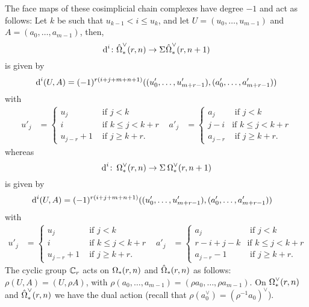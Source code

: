 	The face maps of these cosimplicial chain complexes have degree $-1$ and act as follows: Let $k$ be such that $u_{k-1}<i\leq u_k$, and let $U = (u_0,\ldots,u_{m-1})$ and $A = (a_0,\ldots,a_{m-1})$, then, 
	\[
		\operatorname{d}^i\colon \hat{\operatorname{\Omega}}^{\vee}_{*}(r,n)\to \Sigma^{}\hat{\operatorname{\Omega}}^{\vee}_{*}(r,n+1)
	\]
		is given by
	\[\operatorname{d}^i(U, A) = (-1)^{r(i+j+m+n+1)}((u'_0,\ldots,u'_{m+r-1}),(a'_0,\ldots,a'_{m+r-1}))\] with
\begin{align}\label{eq:Omegahat}
	u'_j &=
	\begin{cases}
		u_j &\text{ if $j<k$} \\
		i & \text{ if $k\leq j < k+r$} \\
		u_{j-r} + 1 & \text{ if $j\geq k+r$.}
	\end{cases}
	&
	a'_j &=
	\begin{cases}
		a_j &\text{ if $j<k$} \\
		j-i & \text{if $k\leq j<k+r$} \\
		a_{j-r} & \text{ if $j\geq k+r$.}
	\end{cases}
\end{align}
whereas 
\[
	\operatorname{d}^i\colon \operatorname{\Omega}^{\vee}_{*}(r,n)\to \Sigma^{}\operatorname{\Omega}^{\vee}_{*}(r,n+1)
	\]
	is given by
\begin{align*}
	\operatorname{d}^i(U, A) &= (-1)^{r(i + j + m + n + 1)}((u'_0,\ldots,u'_{m+r-1}),(a'_0,\ldots,a'_{m+r-1}))
\end{align*}
with
\begin{align}\label{eq:Theta}
	u'_j &=
	\begin{cases}
		u_j &\text{ if $j<k$} \\
		i & \text{ if $k\leq j < k+r$} \\
		u_{j-r} + 1 & \text{ if $j\geq k+r$.}
	\end{cases}
	&
	a'_j &=
	\begin{cases}
		a_j &\text{ if $j<k$} \\
		r-i+j-k & \text{if $k\leq j<k+r$} \\
		a_{j-r}-1 & \text{ if $j\geq k+r$.}
	\end{cases}
\end{align}
The cyclic group $\mathbb{C}_r$ acts on $\operatorname{\Omega}_{*}(r,n)$ and $\hat{\operatorname{\Omega}}_{*}(r,n)$ as follows: $\rho(U,A) = (U,\rho A)$, with $\rho(a_0,\ldots,a_{m-1}) = (\rho a_0,\ldots,\rho a_{m-1})$. On $\operatorname{\Omega}^{\vee}_{*}(r,n)$ and $\hat{\operatorname{\Omega}}^{\vee}_{*}(r,n)$ we have the dual action (recall that $\rho(a_0^\vee) = (\rho^{-1}a_0)^\vee$).

